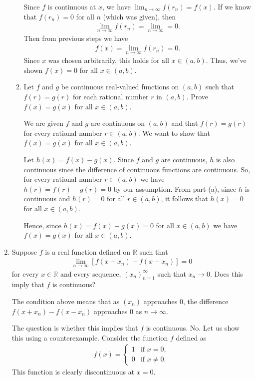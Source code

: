 \documentclass [10pt]{article}
\newcommand{\jg}[1]{{\color{blue} #1}}
\begin{document}
\begin{enumerate}
\begin{enumerate}
{Since $f$ is continuous at $x$, we have $\lim_{n\to \infty} f(r_n) = f(x)$. If we know that $f(r_n) = 0$ for all $n$ (which was given), then 
\begin{align*}
    \lim_{n\to \infty} f(r_n) = \lim_{n\to \infty} = 0.
\end{align*}
Then from previous steps we have
\begin{align*}
    f(x) = \lim_{n\to \infty} f(r_n) = 0.
\end{align*}
Since $x$ was chosen arbitrarily, this holds for all $x \in (a,b)$. Thus, we've shown $f(x) = 0$ for all $x \in (a,b)$.

}

\item Let $f$ and $g$ be continuous real-valued functions on $(a, b)$ such that $f(r)=g(r)$ for each rational number $r$ in $(a, b)$. Prove $f(x)=g(x)$ for all $x \in(a, b)$.

\jg{
We are given $f$ and $g$ are continuous on $(a,b)$ and that $f(r) = g(r)$ for every rational number $r \in (a,b)$. We want to show that $f(x) = g(x)$ for all $x \in (a,b)$. 

Let $h(x) = f(x) - g(x)$. Since $f$ and $g$ are continuous, $h$ is also continuous since the difference of continuous functions are continuous. So, for every rational number $r \in (a,b)$ we have $h(r) = f(r) - g(r) = 0$ by our assumption. From part (a), since $h$ is continuous and $h(r) = 0$ for all $r \in (a,b)$, it follows that $h(x) = 0$ for all $x \in (a,b)$. 

Hence, since $h(x) = f(x) - g(x) = 0$ for all $x \in (a,b)$ we have $f(x) = g(x)$ for all $x \in (a,b)$. 
}
\end{enumerate}
\clearpage

\item Suppose $f$ is a real function defined on $\mathbb{R}$ such that
\begin{align*}
\lim _{n \to \infty}[f(x+x_n)-f(x-x_n)]=0
\end{align*}
for every $x \in \mathbb{R}$ and every sequence, $(x_n)_{n = 1}^{\infty}$ such that
$x_n \to 0$. Does this imply that $f$ is continuous?


\jg{
The condition above means that as $(x_n)$ approaches $0$, the difference $f(x+x_n)-f(x-x_n)$ approaches $0$ as $n \to \infty$. 

The question is whether this implies that $f$ is continuous. 
No. Let us show this using a counterexample. Consider the function $f$ defined as 
\begin{align*}
f(x) = \begin{cases}
1 & \text{if } x = 0, \\
0 & \text{if } x \neq 0.
\end{cases}
\end{align*}
This function is clearly discontinuous at $x = 0$. 

}
\end{enumerate}
\end{document}
